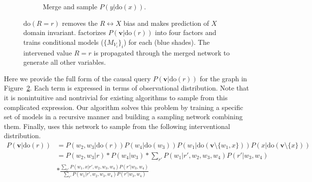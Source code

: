 \documentclass{article}
\newcommand{\red}{\textcolor{red}}
\newcommand{\vb}{\mathbf{v}}
\newcommand{\Do}{\text{do}}
\newcommand{\idgen}{\text{ID-GEN}\xspace}
\theoremstyle{plain}
\theoremstyle{definition}
\theoremstyle{remark}
\begin{document}
\begin{figure}[t!]
\begin{subfigure}{.34\textwidth}
\caption{Merge and sample $P(y|\Do(x)).$
}
\label{fig:appex-merge-net}
\end{subfigure}
    \caption{
    $\Do(R=r)$ removes the $R\leftrightarrow X$ bias and makes prediction of $X$ domain invariant.
\idgen factorizes $P(\vb|\Do(r))$ into four factors and trains conditional models ($\{M_{V_i}\}_{i}$) for each (blue shades).  The intervened value $R=r$ is propagated through the merged network to generate all other variables.
}
    \label{fig:double_napkin}
\end{figure}
%
Here we provide the full form of the causal query $P(\vb|\Do(r))$ for the graph in Figure~\ref{fig:double_napkin}. Each term is expressed in terms of observational distribution. Note that it is nonintuitive and nontrivial for existing algorithms to sample from this complicated expression. Our algorithm \idgen solves this problem by training a specific set of models in a recursive manner and building a sampling network combining them. Finally, \idgen uses this network to sample from the following interventional distribution.
\begin{equation}
\label{appex:eq-complex}
\begin{split}
    P(\vb|\Do(r))&=P(w_2, w_3| \Do(r))
P(w_4|\Do(w_3))
P(w_1|\Do(\vb\setminus\{w_1,x\}))
P(x|\Do(\vb\setminus\{x\}))\\
&= P(w_2, w_3|r)* P(w_4|w_3)* {\textstyle\sum}_{r'} P(w_1|r',w_2,w_3,w_4)P(r'|w_3,w_4)\\
&*\frac{\sum_{r'}P(w_1,x|r',w_2,w_3,w_4)P(r'|w_3,w_4)}
{\sum_{r'}P(w_1|r',w_2,w_3,w_4)P(r'|w_3,w_4)}
\end{split}
\end{equation}
\end{document}

